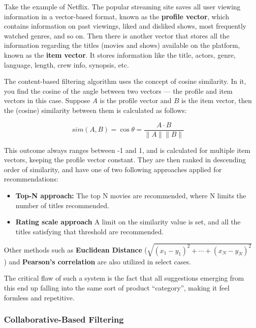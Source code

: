 \documentclass{article}
\begin{document}
\medskip

\noindent Take the example of Netflix. The popular streaming site saves all user viewing information in a vector-based format, known as the \textbf{profile vector}, which contains information on past viewings, liked and disliked shows, most frequently watched genres, and so on. Then there is another vector that stores all the information regarding the titles (movies and shows) available on the platform, known as the \textbf{item vector}. It stores information like the title, actors, genre, language, length, crew info, synopsis, etc.

\medskip

\noindent The content-based filtering algorithm uses the concept of cosine similarity. In it, you find the cosine of the angle between two vectors — the profile and item vectors in this case. Suppose \( A \) is the profile vector and \( B \) is the item vector, then the (cosine) similarity between them is calculated as follows:

$$ sim(A, B) = \cos{\theta} = \frac{A \cdot B}{\|A\| \|B\|} $$

\noindent This outcome always ranges between -1 and 1, and is calculated for multiple item vectors, keeping the profile vector constant. They are then ranked in descending order of similarity, and have one of two following approaches applied for recommendations:

\begin{itemize}
    \item{\textbf{Top-N approach:} The top N movies are recommended, where N limits the number of titles recommended.}
    \item{\textbf{Rating scale approach} A limit on the similarity value is set, and all the titles satisfying that threshold are recommended.}
\end{itemize}

\noindent Other methods such as \textbf{Euclidean Distance} ($ \sqrt{(x_1 - y_1) ^ 2 + \cdots + (x_N - y_N) ^ 2} $) and \textbf{Pearson’s correlation} are also utilized in select cases.

\medskip

\noindent The critical flaw of such a system is the fact that all suggestions emerging from this end up falling into the same sort of product ``category'', making it feel formless and repetitive.

\subsubsection{Collaborative-Based Filtering}
\end{document}
